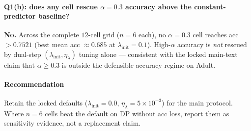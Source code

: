 \paragraph{Q1(b): does any cell rescue $\alpha{=}0.3$ accuracy above the constant-predictor baseline?}
\textbf{No.} Across the complete $12$-cell grid ($n{=}6$ each), no $\alpha{=}0.3$ cell reaches acc $>0.7521$ (best mean acc $\approx0.685$ at $\lambda_{\mathrm{init}}{=}0.1$). High-$\alpha$ accuracy is \emph{not} rescued by dual-step $(\lambda_{\mathrm{init}},\eta_{\lambda})$ tuning alone --- consistent with the locked main-text claim that $\alpha\ge0.3$ is outside the defensible accuracy regime on Adult.

\paragraph{Recommendation}
Retain the locked defaults ($\lambda_{\mathrm{init}}{=}0.0$, $\eta_{\lambda}{=}5\times10^{-3}$) for the main protocol. Where $n{=}6$ cells beat the default on DP without acc loss, report them as sensitivity evidence, not a replacement claim.
